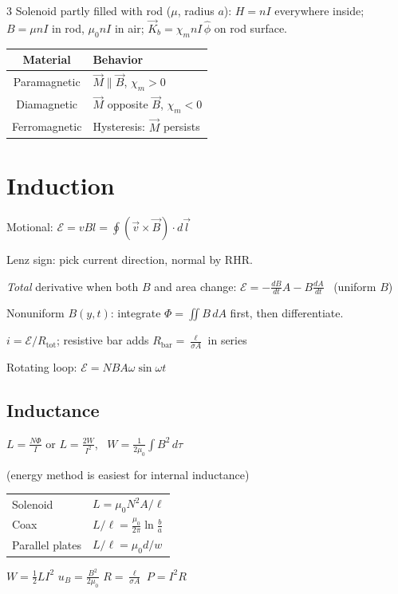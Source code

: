 \documentclass[11pt]{article}
\begin{document}
\begin{multicols*}{3}
Solenoid partly filled with rod ($\mu$, radius $a$): $H=nI$ everywhere inside; $B=\mu nI$ in rod, $\mu_0nI$ in air; $\vec K_b=\chi_mnI\,\hat\phi$ on rod surface.

{\small\begin{tabularx}{\linewidth}{|c|X|}
    \hline
    Material & Behavior \\
    \hline
    Paramagnetic & $\vec M\parallel\vec B$, $\chi_m>0$ \\
    Diamagnetic & $\vec M$ opposite $\vec B$, $\chi_m<0$ \\
    Ferromagnetic & Hysteresis: $\vec M$ persists \\
    \hline
\end{tabularx}}

\section*{Induction}

Motional: $\mathcal E=vBl=\oint(\vec v\times\vec B)\cdot d\vec l$

Lenz sign: pick current direction, normal by RHR.

\emph{Total} derivative when both $B$ and area change:
$\mathcal E=-\frac{dB}{dt}A-B\frac{dA}{dt}$ \ (uniform $B$)

Nonuniform $B(y,t)$: integrate $\Phi=\iint B\,dA$ first, then differentiate.

$i=\mathcal E/R_\text{tot}$; resistive bar adds $R_\text{bar}=\frac{\ell}{\sigma A}$ in series

Rotating loop: $\mathcal E=NBA\omega\sin\omega t$

\subsection*{Inductance}

$L=\frac{N\Phi}{I}$ \quad or \quad $L=\frac{2W}{I^2}$, \ $W=\frac{1}{2\mu_0}\int B^2\,d\tau$

(energy method is easiest for internal inductance)

{\small\begin{tabularx}{\linewidth}{|l|X|}
\hline
Solenoid & $L=\mu_0N^2A/\ell$ \\
Coax & $L/\ell=\frac{\mu_0}{2\pi}\ln\frac ba$ \\
Parallel plates & $L/\ell=\mu_0d/w$ \\
\hline
\end{tabularx}}

$W=\frac12LI^2$ \quad $u_B=\frac{B^2}{2\mu_0}$ \quad $R=\frac{\ell}{\sigma A}$ \quad $P=I^2R$


\end{multicols*}
\end{document}
